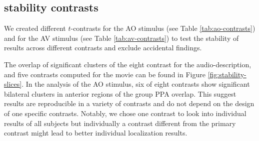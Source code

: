 \documentclass[english]{article}
\begin{document}
\subsection{stability contrasts}




We created different $t$-contrasts for the AO stimulus (see Table
\ref{tab:ao-contrasts}) and for the AV stimulus (see Table
\ref{tab:av-contrasts}) to test the stability of results across different
contrasts and exclude accidental findings.


The overlap of significant clusters of the eight contrast for the
audio-description, and five contrasts computed for the movie can be found in
Figure \ref{fig:stability-slices}.
In the analysis of the AO stimulus, six of eight contrasts show significant
bilateral clusters in anterior regions of the group PPA
overlap.
This suggest results are reproducible in a variety of contrasts and do not
depend on the design of one specific contrasts.
Notably, we chose one contrast to look into individual results of all subjects
but individually a contrast different from the primary contrast might lead to
better individual localization results.
\end{document}
